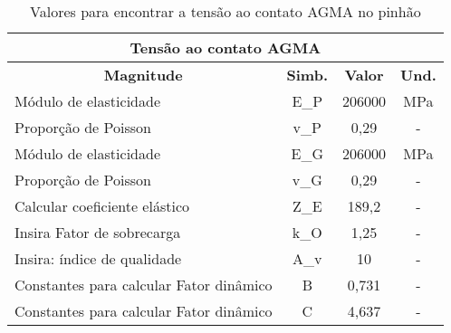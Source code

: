 \begin{table}[]
\centering
\caption{\label{tab:4} Valores para encontrar a tensão ao contato AGMA no pinhão}
\hline
\begin{tabular}{lccc}
\multicolumn{4}{c}{\textbf{Tensão ao contato AGMA}}                                                                                                                        \\ \hline
\multicolumn{1}{c}{\textbf{Magnitude}}                                                                                       & \textbf{Simb.} & \textbf{Valor} & \textbf{Und.} \\ \hline
Módulo de elasticidade                                                                                                       & E_P             & 206000         & MPa           \\
Proporção de Poisson                                                                                                         & v_P             & 0,29           & -             \\
Módulo de elasticidade                                                                                                       & E_G             & 206000         & MPa           \\
Proporção de Poisson                                                                                                         & v_G             & 0,29           & -             \\
Calcular coeficiente elástico                                                                                                & Z_E             & 189,2          & -             \\
Insira Fator de sobrecarga                                                                                                   & k_O             & 1,25           & -             \\
Insira: índice de qualidade                                                                                                  & A_v             & 10             & -             \\
Constantes para calcular Fator dinâmico                                                                                      & B              & 0,731          & -             \\
Constantes para calcular Fator dinâmico                                                                                      & C              & 4,637          & -             \\

\end{tabular}
\end{table}

